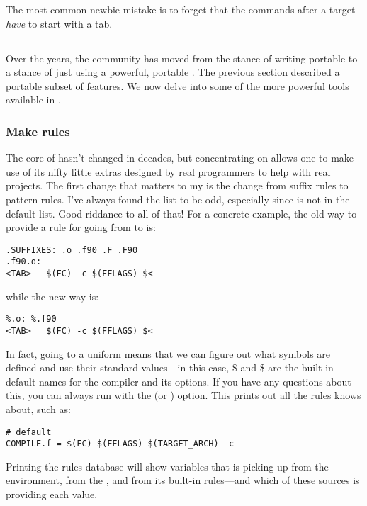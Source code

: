 The most common newbie mistake is to forget that the commands after
a target {\em have} to start with a tab.

\subsection{}

Over the years, the community has moved from the stance of writing
portable  to a stance of just using a powerful, portable
. The previous section described a portable subset of
 features. We now delve into some of the more powerful
tools available in .

\subsubsection{Make rules}

The core of  hasn't changed in decades, but concentrating on
 allows one to make use of its nifty little extras designed
by real programmers to help with real projects. The first change that
matters to my  is the change from suffix rules to
pattern rules. I've always found the  list to be odd,
especially since  is not in the default list. Good riddance
to all of that! For a concrete example, the old way to provide a rule
for going from  to  is:
\begin{verbatim}
.SUFFIXES: .o .f90 .F .F90
.f90.o:
<TAB>   $(FC) -c $(FFLAGS) $<
\end{verbatim}
while the new way is:
\begin{verbatim}
%.o: %.f90
<TAB>   $(FC) -c $(FFLAGS) $<
\end{verbatim}
In fact, going to a uniform  means that we can figure out what
symbols are defined and use their standard values---in this case,
\$ and \$ are the built-in default names
for the compiler and its options.
If you have any
questions about this, you can always run  with the  (or
) option. This prints out all the rules
 knows about, such as:
\begin{verbatim}
# default
COMPILE.f = $(FC) $(FFLAGS) $(TARGET_ARCH) -c
\end{verbatim}
Printing the rules database will show variables that  is
picking up from the environment, from the , and from its
built-in rules---and which of these sources is providing each
value.

